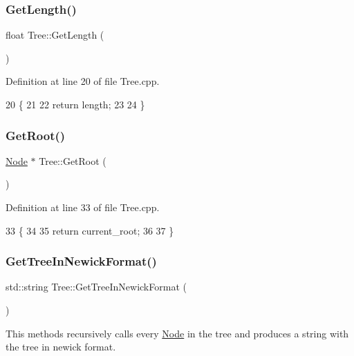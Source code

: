 \subsubsection{\texorpdfstring{Get\+Length()}{GetLength()}}
{\footnotesize\ttfamily float Tree\+::\+Get\+Length (\begin{DoxyParamCaption}{ }\end{DoxyParamCaption})}



Definition at line 20 of file Tree.\+cpp.


\begin{DoxyCode}
20                      \{
21   
22   \textcolor{keywordflow}{return} length;
23   
24 \}
\end{DoxyCode}
\mbox{\label{classTree_a866593b4b067b38394a090e0d57b132f}} 
\subsubsection{\texorpdfstring{Get\+Root()}{GetRoot()}}
{\footnotesize\ttfamily \hyperlink{classNode}{Node} $\ast$ Tree\+::\+Get\+Root (\begin{DoxyParamCaption}{ }\end{DoxyParamCaption})}



Definition at line 33 of file Tree.\+cpp.


\begin{DoxyCode}
33                    \{
34   
35   \textcolor{keywordflow}{return} current\_root;
36   
37 \}
\end{DoxyCode}
\mbox{\label{classTree_a27d9ae5dc8700822a6091eff1e548600}} 
\subsubsection{\texorpdfstring{Get\+Tree\+In\+Newick\+Format()}{GetTreeInNewickFormat()}}
{\footnotesize\ttfamily std\+::string Tree\+::\+Get\+Tree\+In\+Newick\+Format (\begin{DoxyParamCaption}{ }\end{DoxyParamCaption})}

This methods recursively calls every \hyperlink{classNode}{Node} in the tree and produces a string with the tree in newick format.


